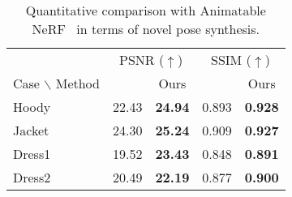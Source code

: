 \begin{table}[t]
\centering
    \caption{Quantitative comparison with Animatable NeRF~\cite{peng2021animatable_nerf} in terms of novel pose synthesis.  }
    \scriptsize
    \begin{threeparttable}
    \begin{tabular}{lcccc}
        \toprule
         & \multicolumn{2}{c}{PSNR ($\uparrow$)} & \multicolumn{2}{c}{SSIM ($\uparrow$)}                \\
        \cmidrule(r){2-3} \cmidrule(r){4-5} 
        Case $\backslash$ Method    & \cite{peng2021animatable_nerf} & Ours & \cite{peng2021animatable_nerf} & Ours \\
        \midrule 
        Hoody & 22.43 & \textbf{24.94} & 0.893 & \textbf{0.928} \\
        Jacket & 24.30 & \textbf{25.24} & 0.909 & \textbf{0.927} \\
        Dress1  & 19.52 & \textbf{23.43} & 0.848 & \textbf{0.891} \\
        Dress2 & 20.49 & \textbf{22.19} & 0.877 & \textbf{0.900} \\
        \bottomrule
    \end{tabular}
    \end{threeparttable}
    \vspace{2pt}
    \label{tab:anerf_comparison}
\end{table}



